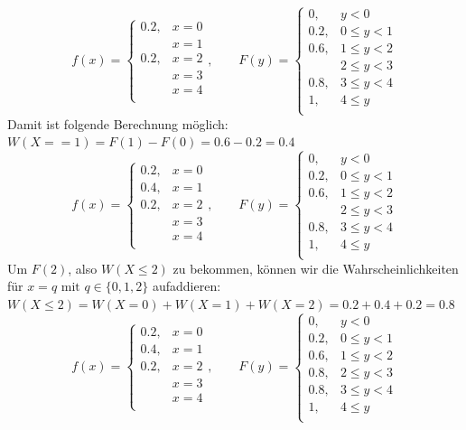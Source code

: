 \documentclass[11pt, a4paper]{article}
\begin{document}
\[
f(x) = 
\begin{cases}
	0.2, & x = 0 \\
	& x = 1 \\
	0.2, & x = 2 \\
	& x = 3 \\
	& x = 4 \\
\end{cases}, \qquad
F(y) =
\begin{cases}
	0, & y < 0 \\
	0.2, & 0 \leq y < 1 \\
	0.6, & 1 \leq y < 2 \\
	& 2 \leq y < 3 \\
	0.8, & 3 \leq y < 4 \\
	1, & 4 \leq y \\
\end{cases}
\]
Damit ist folgende Berechnung möglich: $W(X == 1) = F(1) - F(0) = 0.6 - 0.2 = 0.4$
\[
f(x) = 
\begin{cases}
	0.2, & x = 0 \\
	0.4, & x = 1 \\
	0.2, & x = 2 \\
	& x = 3 \\
	& x = 4 \\
\end{cases}, \qquad
F(y) =
\begin{cases}
	0, & y < 0 \\
	0.2, & 0 \leq y < 1 \\
	0.6, & 1 \leq y < 2 \\
	& 2 \leq y < 3 \\
	0.8, & 3 \leq y < 4 \\
	1, & 4 \leq y \\
\end{cases}
\]
Um $F(2)$, also $W(X \leq 2)$ zu bekommen, können wir die Wahrscheinlichkeiten für $x = q \text{ mit } q \in \{0,1,2\}$ aufaddieren: $W(X \leq 2) = W(X = 0) + W(X = 1) + W(X = 2) = 0.2 + 0.4 + 0.2 = 0.8$
\[
f(x) = 
\begin{cases}
	0.2, & x = 0 \\
	0.4, & x = 1 \\
	0.2, & x = 2 \\
	& x = 3 \\
	& x = 4 \\
\end{cases}, \qquad
F(y) =
\begin{cases}
	0, & y < 0 \\
	0.2, & 0 \leq y < 1 \\
	0.6, & 1 \leq y < 2 \\
	0.8, & 2 \leq y < 3 \\
	0.8, & 3 \leq y < 4 \\
	1, & 4 \leq y \\
\end{cases}
\]
\end{document}
